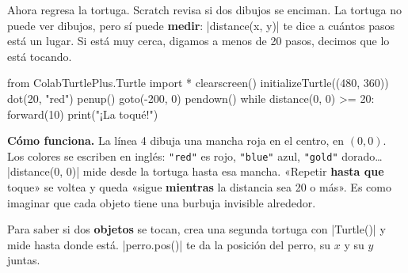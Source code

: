 Ahora regresa la tortuga. Scratch revisa si dos dibujos se enciman. La tortuga no puede ver dibujos, pero sí puede \textbf{medir}: \py|distance(x, y)| te dice a cuántos pasos está un lugar. Si está muy cerca, digamos a menos de 20 pasos, decimos que lo está tocando.

\begin{tcbraster}[raster columns=2, raster equal height=rows, raster column skip=12pt, raster valign=center, raster force size=false, raster column 1/.style={width=0.36\linewidth}, raster column 2/.style={width=0.64\linewidth-12pt}]
\begin{tcolorbox}[colback=white, colframe=white, boxrule=0pt, valign=center, left=0pt, right=0pt]
\begin{scratch}[scale=0.68]
\end{scratch}
\end{tcolorbox}
\begin{code}
from ColabTurtlePlus.Turtle import *
clearscreen()
initializeTurtle((480, 360))
dot(20, "red")
penup()
goto(-200, 0)
pendown()
while distance(0, 0) >= 20:
    forward(10)
print("¡La toqué!")
\end{code}
\end{tcbraster}

\textbf{Cómo funciona.} La línea 4 dibuja una mancha roja en el centro, en $(0, 0)$. Los colores se escriben en inglés: \texttt{"red"} es rojo, \texttt{"blue"} azul, \texttt{"gold"} dorado\ldots{} \py|distance(0, 0)| mide desde la tortuga hasta esa mancha. «Repetir \textbf{hasta que} toque» se voltea y queda «sigue \textbf{mientras} la distancia sea 20 o más». Es como imaginar que cada objeto tiene una burbuja invisible alrededor.

Para saber si dos \textbf{objetos} se tocan, crea una segunda tortuga con \py|Turtle()| y mide hasta donde está. \py|perro.pos()| te da la posición del perro, su $x$ y su $y$ juntas.

